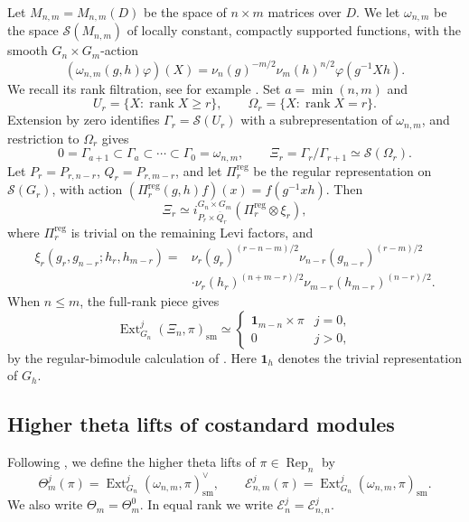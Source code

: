\documentclass[10pt,a4paper]{article}
\theoremstyle{definition}
\theoremstyle{remark}
\numberwithin{equation}{section}
\newcommand{\rep}{\operatorname{Rep}}
\newcommand{\cS}{\mathcal{S}}
\newcommand{\cE}{\mathcal{E}}
\newcommand{\sm}{\mathrm{sm}}
\newcommand{\one}{\mathbf{1}}
\DeclareMathOperator{\Ext}{Ext}
\DeclareMathOperator{\rank}{rank}
\begin{document}
Let $M_{n,m}=M_{n,m}(D)$ be the space of $n\times m$ matrices over $D$. We let
$\omega_{n,m}$ be the space $\cS(M_{n,m})$ of locally constant, compactly
supported functions, with the smooth $G_n\times G_m$-action
\begin{equation}\label{eq:weil}
 (\omega_{n,m}(g,h)\varphi)(X)
 =\nu_n(g)^{-m/2}\nu_m(h)^{n/2}\varphi(g^{-1}Xh).
\end{equation}
We recall its rank filtration, see for example \cite[\S\S2--3]{Minguez2008}. Set $a=\min(n,m)$ and
\[
 U_r=\{X:\rank X\geq r\},\qquad \Omega_r=\{X:\rank X=r\}.
\]
Extension by zero identifies $\Gamma_r=\cS(U_r)$ with a subrepresentation of
$\omega_{n,m}$, and restriction to $\Omega_r$ gives
\[
 0=\Gamma_{a+1}\subset \Gamma_a\subset\cdots\subset \Gamma_0=\omega_{n,m},
 \qquad \Xi_r=\Gamma_r/\Gamma_{r+1}\simeq\cS(\Omega_r).
\]
Let $P_r=P_{r,n-r}$, $Q_r=P_{r,m-r}$, and let $\Pi_r^{\mathrm{reg}}$ be the regular
representation on $\cS(G_r)$, with action
$(\Pi_r^{\mathrm{reg}}(g,h)f)(x)=f(g^{-1}xh)$. Then
\begin{equation}\label{eq:rank-piece}
 \Xi_r\simeq i_{P_r\times\overline Q_r}^{G_n\times G_m}
              (\Pi_r^{\mathrm{reg}}\otimes\xi_r),
\end{equation}
where $\Pi_r^{\mathrm{reg}}$ is trivial on the remaining Levi factors, and
\begin{align*}
 \xi_r(g_r,g_{n-r};h_r,h_{m-r})
 ={}&\nu_r(g_r)^{(r-n-m)/2}\nu_{n-r}(g_{n-r})^{(r-m)/2}\\
 &\cdot\nu_r(h_r)^{(n+m-r)/2}\nu_{m-r}(h_{m-r})^{(n-r)/2}.
\end{align*}
When $n\leq m$, the full-rank piece gives
\begin{equation}\label{eq:open-piece}
 \Ext^j_{G_n}(\Xi_n,\pi)_\sm\simeq
 \begin{cases}\one_{m-n}\times\pi&j=0,\\0&j>0,\end{cases}
\end{equation}
by the regular-bimodule calculation of
\cite[Lemma~2.4 and equation~(14)]{APS2017}. Here $\one_h$ denotes the trivial
representation of $G_h$.

\subsection{Higher theta lifts of costandard modules}

Following \cite{APS2017}, we define the higher theta lifts of
$\pi\in\rep_n$ by
\begin{equation}\label{eq:theta-definition}
 \Theta^j_m(\pi)=\Ext^j_{G_n}(\omega_{n,m},\pi)_\sm^\vee,
 \qquad \cE^j_{n,m}(\pi)=\Ext^j_{G_n}(\omega_{n,m},\pi)_\sm.
\end{equation}
We also write $\Theta_m=\Theta_m^0$.
In equal rank we write $\cE^j_n=\cE^j_{n,n}$.
\end{document}
